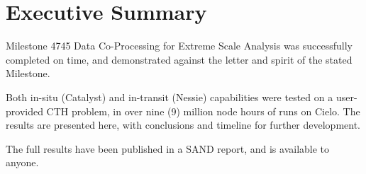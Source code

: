 \section*{Executive Summary}

Milestone 4745 Data Co-Processing for Extreme Scale Analysis was successfully completed on time, and demonstrated against the letter and spirit of the stated Milestone.

Both in-situ (Catalyst) and in-transit (Nessie) capabilities were tested on a user-provided CTH problem, in over nine (9) million node hours of runs on Cielo.  The results are presented here, with conclusions and timeline for further development.

The full results have been published in a SAND report, and is available to anyone.

